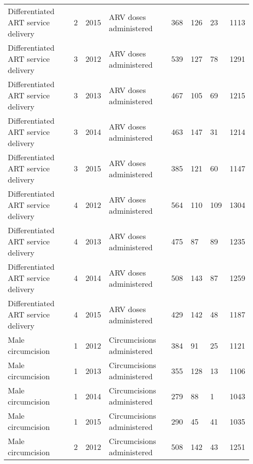 \documentclass{article}
\begin{document}
\begin{table}[]
\begin{tabular}{llllllll}
Differentiated ART service delivery & 2    & 2015 & ARV doses administered          & 368       & 126                & 23              & 1113   \\
Differentiated ART service delivery & 3    & 2012 & ARV doses administered          & 539       & 127                & 78              & 1291   \\
Differentiated ART service delivery & 3    & 2013 & ARV doses administered          & 467       & 105                & 69              & 1215   \\
Differentiated ART service delivery & 3    & 2014 & ARV doses administered          & 463       & 147                & 31              & 1214   \\
Differentiated ART service delivery & 3    & 2015 & ARV doses administered          & 385       & 121                & 60              & 1147   \\
Differentiated ART service delivery & 4    & 2012 & ARV doses administered          & 564       & 110                & 109             & 1304   \\
Differentiated ART service delivery & 4    & 2013 & ARV doses administered          & 475       & 87                 & 89              & 1235   \\
Differentiated ART service delivery & 4    & 2014 & ARV doses administered          & 508       & 143                & 87              & 1259   \\
Differentiated ART service delivery & 4    & 2015 & ARV doses administered          & 429       & 142                & 48              & 1187   \\
Male circumcision                                      & 1    & 2012 & Circumcisions administered & 384       & 91                 & 25              & 1121   \\
Male circumcision                                      & 1    & 2013 & Circumcisions administered & 355       & 128                & 13              & 1106   \\
Male circumcision                                      & 1    & 2014 & Circumcisions administered & 279       & 88                 & 1               & 1043   \\
Male circumcision                                      & 1    & 2015 & Circumcisions administered & 290       & 45                 & 41              & 1035   \\
Male circumcision                                      & 2    & 2012 & Circumcisions administered & 508       & 142                & 43              & 1251   \\

\end{tabular}
\end{table}
\end{document}
